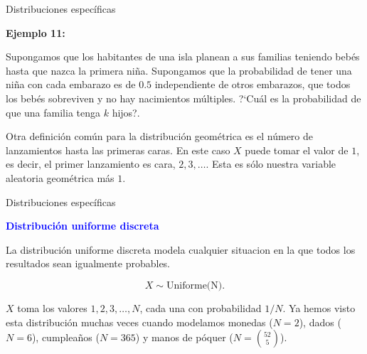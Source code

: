 \documentclass[10pt]{beamer}
\begin{document}
\begin{frame}{Distribuciones espec\'ificas}
	\small{
\textbf{Ejemplo 11:}

Supongamos que los habitantes de una isla planean a sus familias teniendo beb\'es hasta que nazca la primera ni\~na. Supongamos que la probabilidad de tener una ni\~na con cada embarazo es de $0.5$ independiente de otros embarazos, que todos los beb\'es sobreviven y no hay nacimientos m\'ultiples. ?`Cu\'al es la probabilidad de que una familia tenga $k$ hijos?.}

\vspace{0.8cm}

\scriptsize{Otra definici\'on com\'un para la distribuci\'on geom\'etrica es el n\'umero de lanzamientos hasta las primeras caras. En este caso $X$ puede tomar el valor de $1$, es decir, el primer lanzamiento es cara, $2, 3,\dots$.  Esta es s\'olo nuestra variable aleatoria geom\'etrica m\'as $1$. 
	
}
	
\end{frame}

\begin{frame}{Distribuciones  espec\'ificas}

\textbf{\textcolor{blue}{Distribuci\'on uniforme discreta}}

La distribuci\'on uniforme discreta modela cualquier situacion en la que todos los resultados sean igualmente probables.

\[
X \sim \text{Uniforme(N)}.
\]

\vspace{0.2cm}

$X$ toma los valores $1, 2, 3,\dots, N$, cada una con probabilidad $1/ N$. Ya hemos visto esta distribuci\'on muchas veces cuando modelamos monedas  ($N = 2$), dados ($N = 6$), cumplea\~nos ($N = 365$) y manos de p\'oquer ($N = \binom{52}{5}$).
\end{frame}
\end{document}
